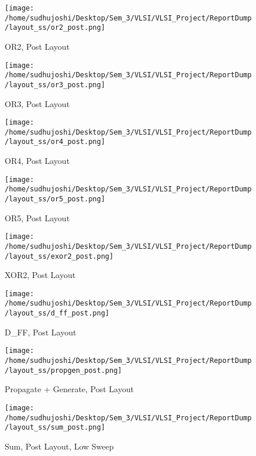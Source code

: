 \documentclass[conference]{IEEEtran}
\begin{document}
\begin{figure}[H] 
    \centering
    \texttt{[image: /home/sudhujoshi/Desktop/Sem\_3/VLSI/VLSI\_Project/ReportDump/layout\_ss/or2\_post.png]}
    \caption{OR2, Post Layout} 
\end{figure}
\begin{figure}[H] 
    \centering
    \texttt{[image: /home/sudhujoshi/Desktop/Sem\_3/VLSI/VLSI\_Project/ReportDump/layout\_ss/or3\_post.png]}
    \caption{OR3, Post Layout} 
\end{figure}
\begin{figure}[H] 
    \centering
    \texttt{[image: /home/sudhujoshi/Desktop/Sem\_3/VLSI/VLSI\_Project/ReportDump/layout\_ss/or4\_post.png]}
    \caption{OR4, Post Layout} 
\end{figure}
\begin{figure}[H] 
    \centering
    \texttt{[image: /home/sudhujoshi/Desktop/Sem\_3/VLSI/VLSI\_Project/ReportDump/layout\_ss/or5\_post.png]}
    \caption{OR5, Post Layout} 
\end{figure}


\begin{figure}[H] 
    \centering
    \texttt{[image: /home/sudhujoshi/Desktop/Sem\_3/VLSI/VLSI\_Project/ReportDump/layout\_ss/exor2\_post.png]}
    \caption{XOR2, Post Layout} 
\end{figure}
\begin{figure}[H] 
    \centering
    \texttt{[image: /home/sudhujoshi/Desktop/Sem\_3/VLSI/VLSI\_Project/ReportDump/layout\_ss/d\_ff\_post.png]}
    \caption{D\_FF, Post Layout} 
\end{figure}

\begin{figure}[H] 
    \centering
    \texttt{[image: /home/sudhujoshi/Desktop/Sem\_3/VLSI/VLSI\_Project/ReportDump/layout\_ss/propgen\_post.png]}
    \caption{Propagate + Generate, Post Layout} 
\end{figure}
\begin{figure}[H] 
    \centering
    \texttt{[image: /home/sudhujoshi/Desktop/Sem\_3/VLSI/VLSI\_Project/ReportDump/layout\_ss/sum\_post.png]}
    \caption{Sum, Post Layout, Low Sweep} 
\end{figure}
\end{document}
